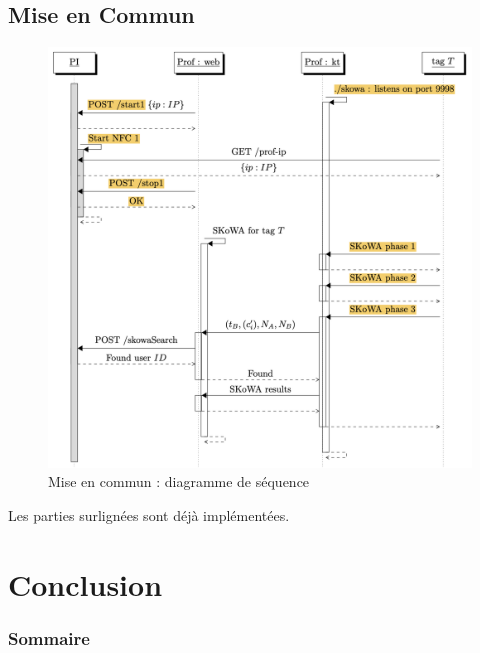 \documentclass[aspectratio=169]{beamer}
\begin{document}
\subsection{Mise en Commun}

\begin{frame}
  \begin{minipage}{.7\textwidth}
    \begin{figure}
      \centering
      \includegraphics[height=.9\textheight]{../assets/seq.png}
      \captionsetup{labelformat=empty}
      \caption{Mise en commun : diagramme de séquence}
    \end{figure}
  \end{minipage}%
  \begin{minipage}{.3\textwidth}
    Les parties surlignées sont déjà implémentées.
  \end{minipage}
  
\end{frame}

\section{Conclusion}

\begin{frame}
  \frametitle{Sommaire}
  \tableofcontents[
      currentsection,
      sectionstyle=show/shaded,
      subsectionstyle=hide/hide/hide
  ]
\end{frame}
\end{document}
